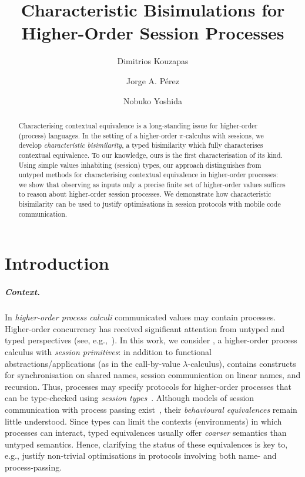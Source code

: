 \documentclass[a4paper,UKenglish]{lipics}
\title{Characteristic Bisimulations for Higher-Order Session Processes}
\author[1,2]{Dimitrios Kouzapas}
\author[3]{Jorge A. P\'{e}rez}
\author[1]{Nobuko Yoshida}
\affil[1]{Imperial College London, UK
}
\affil[2]{University of Glasgow, UK
}
\affil[3]{University of Groningen, The Netherlands 
}
\theoremstyle{definition}
\begin{document}
\maketitle


\begin{abstract}
Characterising 
contextual equivalence is a long-standing issue for higher-order (process) languages. 
In the setting of a higher-order $\pi$-calculus with sessions, 
we develop \emph{characteristic bisimilarity}, 
a typed bisimilarity which fully characterises contextual equivalence.
To our knowledge, ours is the first characterisation of its kind.
Using simple values inhabiting (session) types, 
our approach distinguishes from untyped methods for 
characterising contextual equivalence in higher-order processes:
we show that observing as inputs only a precise finite set of higher-order values suffices 
to reason about higher-order session processes. 
We demonstrate how characteristic bisimilarity can be used to justify optimisations in session protocols with mobile code communication.
\end{abstract}


\section{Introduction}
\label{sec:intro}

\subparagraph{Context.}
In \emph{higher-order process calculi} 
communicated
values %
may contain  processes.
Higher-order concurrency has received significant attention 
from untyped and typed perspectives (see, e.g.,~\cite{SangiorgiD:expmpa,JeffreyR05,DBLP:journals/iandc/LanesePSS11,DBLP:journals/cl/KoutavasH12,MostrousY15}).
 In this work, we consider \HOp, a higher-order process calculus with \emph{session primitives}:
in addition to 
functional
abstractions/applications (as in the call-by-value $\lambda$-calculus), \HOp 
contains constructs for 
synchronisation on shared names, 
  session communication on linear names, 
  and recursion.
Thus, \HOp processes may specify %
protocols
for higher-order  processes that
 can be 
 type-checked 
 using \emph{session types}~\cite{honda.vasconcelos.kubo:language-primitives}.
Although models of session 
communication with %
process passing
exist~\cite{tlca07,DBLP:journals/jfp/GayV10},
their  \emph{behavioural equivalences} 
remain little understood. 
Since types can limit the contexts (environments) in which processes can interact, typed equivalences
usually offer {\em coarser} semantics than untyped semantics.
Hence, clarifying the status of these equivalences is key to, e.g., 
justify non-trivial  optimisations in protocols involving both name- and process-passing.
 
\end{document}
